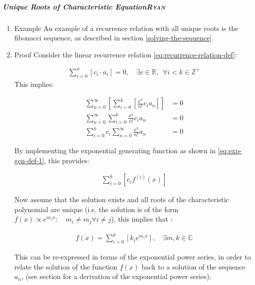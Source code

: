 \documentclass[11pt]{article}
\begin{document}
\subparagraph{Unique Roots of Characteristic Equation\hfill{}\textsc{Ryan}}
\label{uniq-roots-recurrence}
\begin{enumerate}
\item Example
\label{sec:org6d25d9e}
An example of a recurrence relation with all unique roots is the fibonacci sequence, as described in section \ref{solving-the-sequence}.
\item Proof
\label{sec:orgdab8868}
Consider the linear recurrence relation \eqref{eq:recurrence-relation-def}:

\begin{align}
\sum^{n}_{i= 0}   \left[ c_i \cdot  a_i \right] = 0, \quad \exists c \in
\mathbb{R}, \enspace \forall i<k\in\mathbb{Z}^+ \nonumber \label{eq:recurrence-relation-def}
\end{align}
This implies:


\begin{align}
    \sum^{\infty}_{n= 0}   \left[ \sum^{k}_{i= 0}   \left[ \frac{x^n}{n!} c_i a_n \right]  \right]  &= 0 \\
    \sum^{\infty}_{n= 0}    \sum^{k}_{i= 0}    \frac{x^n}{n!} c_i a_n    &= 0 \\
        \sum^{k}_{i= 0} c_i \sum^{\infty}_{n= 0}    \frac{x^n}{n!}  a_n    &= 0
\end{align}

By implementing the exponential generating function as shown in
\eqref{eq:exp-gen-def-1}, this provides:

\begin{align}
   \sum^{k}_{i= 0}   \left[ c_i f^{\left( i \right)}\left( x \right) \right]
\end{align}


Now assume that the solution exists and all roots of the characteristic polynomial are unique (i.e. the solution is of the form \(f{\left({ x }\right)} \propto e^{m_i x}: \quad m_i \neq m_j \forall i\neq j\)), this implies that  \cite[Ch. 4]{zillDifferentialEquations2009a} :

\begin{align}
    f{\left({ x }\right)} = \sum^{k}_{i= 0}   {\left[{ k_i e^{m_i x} }\right]}, \quad \exists m,k \in \mathbb{C} \nonumber
\end{align}

This can be re-expressed in terms of the exponential power series, in order to relate the solution of the function \(f{\left({ x }\right)}\) back to a solution of the sequence \(a_n\), (see section for a derivation of the exponential power series):


\end{enumerate}
\end{document}
